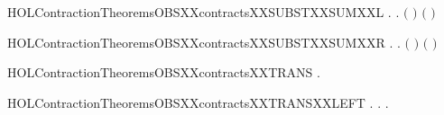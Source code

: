 \newcommand{\HOLContractionTheoremsOBSXXcontractsXXSUBSTXXRESTR}{\UseVerbatim{HOLContractionTheoremsOBSXXcontractsXXSUBSTXXRESTR}}
\begin{SaveVerbatim}{HOLContractionTheoremsOBSXXcontractsXXSUBSTXXSUMXXL}
\HOLTokenTurnstile{} \HOLSymConst{\HOLTokenForall{}} .
          \HOLSymConst{\HOLTokenImp{}}
       \HOLSymConst{\HOLTokenForall{}}.  \ensuremath{(} \HOLSymConst{\ensuremath{+}} \ensuremath{)} \ensuremath{(} \HOLSymConst{\ensuremath{+}} \ensuremath{)}
\end{SaveVerbatim}
\newcommand{\HOLContractionTheoremsOBSXXcontractsXXSUBSTXXSUMXXL}{\UseVerbatim{HOLContractionTheoremsOBSXXcontractsXXSUBSTXXSUMXXL}}
\begin{SaveVerbatim}{HOLContractionTheoremsOBSXXcontractsXXSUBSTXXSUMXXR}
\HOLTokenTurnstile{} \HOLSymConst{\HOLTokenForall{}} .
          \HOLSymConst{\HOLTokenImp{}}
       \HOLSymConst{\HOLTokenForall{}}.  \ensuremath{(} \HOLSymConst{\ensuremath{+}} \ensuremath{)} \ensuremath{(} \HOLSymConst{\ensuremath{+}} \ensuremath{)}
\end{SaveVerbatim}
\newcommand{\HOLContractionTheoremsOBSXXcontractsXXSUBSTXXSUMXXR}{\UseVerbatim{HOLContractionTheoremsOBSXXcontractsXXSUBSTXXSUMXXR}}
\begin{SaveVerbatim}{HOLContractionTheoremsOBSXXcontractsXXTRANS}
\HOLTokenTurnstile{} \HOLSymConst{\HOLTokenForall{}}  .
          \HOLSymConst{\HOLTokenConj{}}    \HOLSymConst{\HOLTokenImp{}}
         
\end{SaveVerbatim}
\newcommand{\HOLContractionTheoremsOBSXXcontractsXXTRANS}{\UseVerbatim{HOLContractionTheoremsOBSXXcontractsXXTRANS}}
\begin{SaveVerbatim}{HOLContractionTheoremsOBSXXcontractsXXTRANSXXLEFT}
\HOLTokenTurnstile{} \HOLSymConst{\HOLTokenForall{}} .
          \HOLSymConst{\HOLTokenImp{}}
       \HOLSymConst{\HOLTokenForall{}} .  \HOLTokenTransBegin{}\HOLTokenTransEnd {} \HOLSymConst{\HOLTokenImp{}} \HOLSymConst{\HOLTokenExists{}}.  \HOLTokenTransBegin{}\HOLTokenTransEnd {} \HOLSymConst{\HOLTokenConj{}}   
\end{SaveVerbatim}
